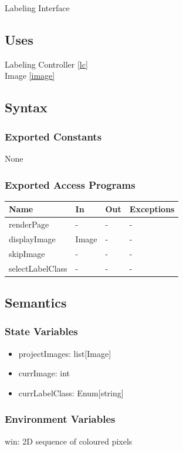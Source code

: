 \documentclass[12pt, titlepage]{article}
\begin{document}
Labeling Interface

\subsection{Uses}

Labeling Controller \ref{lc} \\
Image \ref{image}

\subsection{Syntax}

\subsubsection{Exported Constants}
None
\subsubsection{Exported Access Programs}

\begin{center}
\begin{tabular}{p{4cm} p{4cm} p{4cm} p{2cm}}
\hline
\textbf{Name} & \textbf{In} & \textbf{Out} & \textbf{Exceptions} \\
\hline
renderPage & - & - & - \\
displayImage & Image & - & - \\
skipImage & - & - & - \\
selectLabelClass & - & - & - \\
\hline
\end{tabular}
\end{center}

\subsection{Semantics}

\subsubsection{State Variables}
\begin{itemize}
    \item projectImages: list[Image]
    \item currImage: int
    \item currLabelClass: Enum[string]
\end{itemize}
\subsubsection{Environment Variables}
win: 2D sequence of coloured pixels
\end{document}
